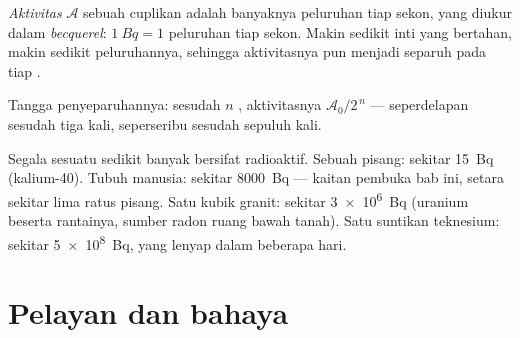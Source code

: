 \begin{definition}[Aktivitas]\label{def:g11:nucleus-radioactivity:activity}
\emph{Aktivitas} $\mathcal A$ sebuah cuplikan adalah
banyaknya peluruhan tiap sekon, yang diukur dalam
\emph{becquerel}: $\qty{1}{Bq} = 1$ peluruhan tiap sekon.
Makin sedikit inti yang bertahan, makin sedikit peluruhannya, sehingga
aktivitasnya pun menjadi separuh pada tiap .
\end{definition}

\begin{omfigure}

{\small Tangga penyeparuhannya: sesudah $n$ , aktivitasnya
$\mathcal A_0/2^{\,n}$ --- seperdelapan sesudah tiga kali, seperseribu
sesudah sepuluh kali.}
\end{omfigure}

\begin{example}\label{ex:g11:nucleus-radioactivity:orders}
Segala sesuatu sedikit banyak bersifat radioaktif. Sebuah pisang: sekitar
\qty{15}{Bq} (kalium-40). Tubuh manusia: sekitar \qty{8000}{Bq} --- kaitan
pembuka bab ini, setara sekitar lima ratus pisang. Satu  kubik granit:
sekitar \qty{3e6}{Bq} (uranium beserta rantainya, sumber radon ruang bawah
tanah). Satu suntikan teknesium: sekitar \qty{5e8}{Bq}, yang lenyap dalam
beberapa hari.
\end{example}

\section{Pelayan dan bahaya}

